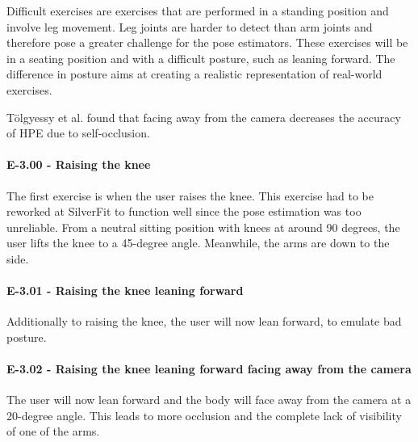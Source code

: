 Difficult exercises are exercises that are performed in a standing position and involve leg movement. Leg joints are harder to detect than arm joints and therefore pose a greater challenge for the pose estimators. These exercises will be in a seating position and with a difficult posture, such as leaning forward. The difference in posture aims at creating a realistic representation of real-world exercises.

Tölgyessy et al. found that facing away from the camera decreases the accuracy of HPE due to self-occlusion. \cite{HPEIsHard}

\paragraph{E-3.00 - Raising the knee}

The first exercise is when the user raises the knee. This exercise had to be reworked at SilverFit to function well since the pose estimation was too unreliable. From a neutral sitting position with knees at around 90 degrees, the user lifts the knee to a 45-degree angle. Meanwhile, the arms are down to the side.

\paragraph{E-3.01 - Raising the knee leaning forward}

Additionally to raising the knee, the user will now lean forward, to emulate bad posture.

\paragraph{E-3.02 - Raising the knee leaning forward facing away from the camera}

The user will now lean forward and the body will face away from the camera at a 20-degree angle. This leads to more occlusion and the complete lack of visibility of one of the arms. 